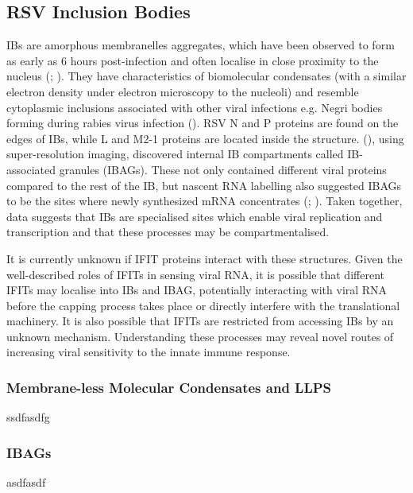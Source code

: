 \subsection{RSV Inclusion Bodies} \label{subsec:RSV Inclusion Bodies}
IBs are amorphous membranelles aggregates, which have been observed to form as early as 6 hours post-infection and often localise in close proximity to the nucleus (\cite{Bachi1973MorphogenesisVirus}; \cite{Jobe2020RespiratorySignaling}). They have characteristics of biomolecular condensates (with a similar electron density under electron microscopy to the nucleoli) and resemble cytoplasmic inclusions associated with other viral infections e.g. Negri bodies forming during rabies virus infection (\cite{Nikolic2017NegriOrganelles}). RSV N and P proteins are found on the edges of IBs, while L and M2-1 proteins are located inside the structure. (\cite{Rincheval2017FunctionalVirus}), using super-resolution imaging, discovered internal IB compartments called IB-associated granules (IBAGs). These not only contained different viral proteins compared to the rest of the IB, but nascent RNA labelling also suggested IBAGs to be the sites where newly synthesized mRNA concentrates (\cite{Jobe2020RespiratorySignaling}; \cite{Richard2018RSVTranscription}). Taken together, data suggests that IBs are specialised sites which enable viral replication and transcription and that these processes may be compartmentalised.

It is currently unknown if IFIT proteins interact with these structures. Given the well-described roles of IFITs in sensing viral RNA, it is possible that different IFITs may localise into IBs and IBAG, potentially interacting with viral RNA before the capping process takes place or directly interfere with the translational machinery. It is also possible that IFITs are restricted from accessing IBs by an unknown mechanism. Understanding these processes may reveal novel routes of increasing viral sensitivity to the innate immune response.




\subsubsection{Membrane-less Molecular Condensates and LLPS} \label{Membrane-less Molecular Condensates and LLPS}
ssdfasdfg



\subsubsection{IBAGs} \label{IBAGs}
asdfasdf



